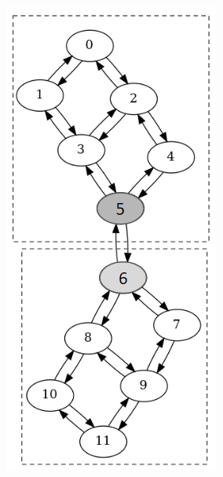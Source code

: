 \begin{figure}[!htb]
\begin{subfigure}{0.25\linewidth}
        \includegraphics[width=\linewidth]{image/coupling_graph_grid.png}

\end{subfigure}
\end{figure}
